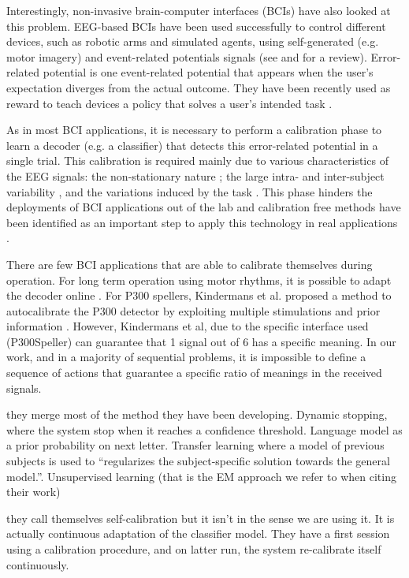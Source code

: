 Interestingly, non-invasive brain-computer interfaces (BCIs) have also looked at this problem. EEG-based BCIs have been used successfully to control different devices, such as robotic arms and simulated agents, using self-generated (e.g. motor imagery) and event-related potentials signals (see \cite{chavarriaga2014errare} and \cite{millan10} for a review). 
%
Error-related potential is one event-related potential that appears when the user's expectation diverges from the actual outcome. They have been recently used as reward to teach devices a policy that solves a user's intended task \cite{chavarriaga2010learning,iturrate2010robot}.

As in most BCI applications, it is necessary to perform a calibration phase to learn a decoder (e.g. a classifier) that detects this error-related potential in a single trial. This calibration is required mainly due to various characteristics of the EEG signals: the non-stationary nature \cite{vidaurre11}; the large intra- and inter-subject variability \cite{Polich1997}, and the variations induced by the task \cite{iturrate2013task}. This phase hinders the deployments of BCI applications out of the lab and calibration free methods have been identified as an important step to apply this technology in real applications \cite{millan10}. 

There are few BCI applications that are able to calibrate themselves during operation.  For long term operation using motor rhythms, it is possible to adapt the decoder online \cite{vidaurre2010towards}. For P300 spellers, Kindermans et al. proposed a method to autocalibrate the P300 detector by exploiting multiple stimulations and prior information \cite{Kindermans2012a,Kindermans2012b}. However, Kindermans et al, due to the specific interface used (P300Speller) can guarantee that 1 signal out of 6 has a specific meaning. In our work, and in a majority of sequential problems, it is impossible to define a sequence of actions that guarantee a specific ratio of meanings in the received signals.

\cite{kindermans2014integrating} they merge most of the method they have been developing. Dynamic stopping, where the system stop when it reaches a confidence threshold. Language model as a prior probability on next letter. Transfer learning where a model of previous subjects is used to ``regularizes the subject-specific solution towards the general model.''. Unsupervised learning (that is the EM approach we refer to when citing their work)

\cite{schettini2014self} they call themselves self-calibration but it isn't in the sense we are using it. It is actually continuous adaptation of the classifier model. They have a first session using a calibration procedure, and on latter run, the system re-calibrate itself continuously.

